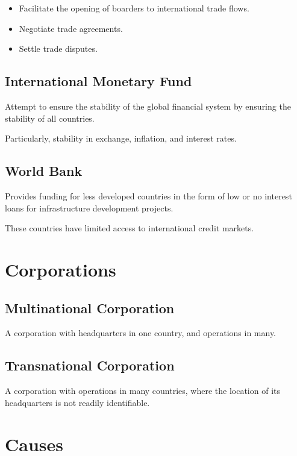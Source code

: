 \documentclass[a4paper,11pt]{article}
\begin{document}
\begin{itemize}
\item Facilitate the opening of boarders to international trade flows.
\item Negotiate trade agreements.
\item Settle trade disputes.
\end{itemize}


\subsection{International Monetary Fund}

Attempt to ensure the stability of the global financial system by ensuring the
stability of all countries.

Particularly, stability in exchange, inflation, and interest rates.


\subsection{World Bank}

Provides funding for less developed countries in the form of low or no interest
loans for infrastructure development projects.

These countries have limited access to international credit markets.




\section{Corporations}

\subsection{Multinational Corporation}

A corporation with headquarters in one country, and operations in many.


\subsection{Transnational Corporation}

A corporation with operations in many countries, where the location of its
headquarters is not readily identifiable.




\section{Causes}
\end{document}
